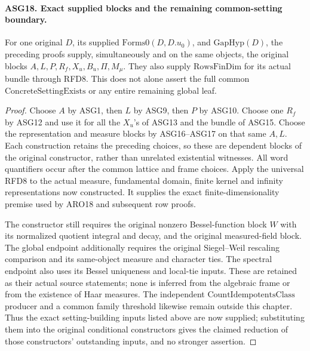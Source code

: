 \paragraph{ASG18. Exact supplied blocks and the remaining common-setting boundary.}
\label{claim:ASG18}
For one original \(D\), its supplied \(\mathrm{Forms0}(D,D.u_0)\),
and \(\mathrm{GapHyp}(D)\), the preceding proofs supply,
simultaneously and on the same objects, the original blocks
\(A,L,P,R_f,X_u,B_u,\Pi,M_\mu\).
They also supply \(\mathrm{RowsFinDim}\) for its actual bundle
through RFD8.  This does not alone assert the full common
\(\mathrm{ConcreteSettingExists}\) or any entire remaining global leaf.
\begin{proof}
Choose \(A\) by ASG1, then \(L\) by ASG9, then \(P\)
by ASG10.  Choose one \(R_f\) by ASG12 and use it for all the
\(X_u\)'s of ASG13 and the bundle of ASG15.  Choose the
representation and measure blocks by ASG16--ASG17 on that same
\(A,L\).  Each construction retains the preceding choices, so
these are dependent blocks of the original constructor, rather than
unrelated existential witnesses.  All word quantifiers occur after
the common lattice and frame choices.  Apply the universal RFD8 to
the actual measure, fundamental domain, finite kernel and infinity
representations now constructed.  It supplies the exact
finite-dimensionality premise used by ARO18 and subsequent row proofs.

The constructor still requires the original nonzero Bessel-function
block \(W\) with its normalized quotient integral and decay, and
the original measured-field block.  The global endpoint additionally
requires the original Siegel--Weil rescaling comparison and its
same-object measure and character ties.  The spectral endpoint also
uses its Bessel uniqueness and local-tie inputs.  These are retained
as their actual source statements; none is inferred from the algebraic
frame or from the existence of Haar measures.  The independent
\(\mathrm{CountIdempotentsClass}\) producer and a common family
threshold likewise remain outside this chapter.
Thus the exact setting-building inputs listed above are now supplied;
substituting them into the original conditional constructors gives the
claimed reduction of those constructors' outstanding inputs, and no
stronger assertion.
\end{proof}
